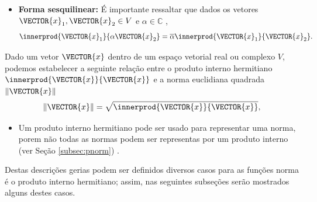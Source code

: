 \begin{tcbattention}
\begin{itemize}
\item \textbf{Forma sesquilinear:} 
É importante ressaltar que dados os vetores $\VECTOR{x}_1,\VECTOR{x}_2 \in V$ 
 e $\alpha \in \mathbb{C}$ \cite[pp. 242]{damiano2011course},
\begin{equation}
\innerprod{ \VECTOR{x}_1}{\alpha \VECTOR{x}_2} =\overline{\alpha} \innerprod{\VECTOR{x}_1}{\VECTOR{x}_2}.
\end{equation}

\end{itemize}
\end{tcbattention}

\begin{definition}
Dado um vetor $\VECTOR{x}$ dentro de um espaço vetorial real ou complexo $V$,
podemos estabelecer a seguinte relação entre o 
produto interno hermitiano $\innerprod{\VECTOR{x}}{\VECTOR{x}}$ e 
a norma euclidiana quadrada $\|\VECTOR{x}\|$ 
\cite[pp. 44]{d2019hermitian}  \cite[pp. 242]{damiano2011course}
\begin{equation}
\|\VECTOR{x}\|=\sqrt{\innerprod{\VECTOR{x}}{\VECTOR{x}}},
\end{equation} 
\end{definition}

\begin{tcbattention}
\begin{itemize}
\item Um produto interno hermitiano pode ser usado para representar uma norma,
porem não todas as normas podem ser representas por um produto interno 
(ver Seção \ref{subsec:pnorm}) \cite[pp. 45]{d2019hermitian}.
\end{itemize}
\end{tcbattention}

Destas descrições gerias podem ser definidos diversos casos para as funções
norma é o produto interno hermitiano; assim, 
nas seguintes subseções serão mostrados alguns destes casos.

